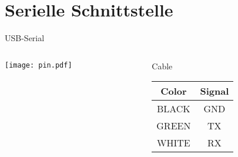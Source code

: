 \section{Serielle Schnittstelle}
\begin{frame}{USB-Serial}
\begin{columns}
\begin{column}{0.5\textwidth}
\texttt{[image: pin.pdf]}
\end{column}
\begin{column}{0.5\textwidth}
\begin{block}{Cable}
\vspace{5mm}
\begin{tabular}{c|c}
Color & Signal\\
\hline
BLACK & GND\\
GREEN & TX\\
WHITE & RX
\end{tabular}
\end{block}
\end{column}
\end{columns}
\end{frame}


